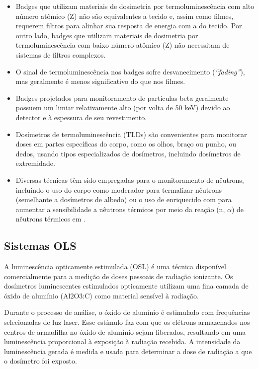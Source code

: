 \documentclass[11pt,a4paper]{article}
\newcounter{exemplo}
\begin{document}
	\begin{exemplo}
		\begin{itemize}
			\item Badges que utilizam materiais de dosimetria por termoluminescência com alto número atômico (Z) não são equivalentes a tecido e, assim como filmes, requerem filtros para alinhar sua resposta de energia com a do tecido. Por outro lado, badges que utilizam materiais de dosimetria por termoluminescência com baixo número atômico (Z) não necessitam de sistemas de filtros complexos.
			\item O sinal de termoluminescência nos badges sofre desvanecimento (\textit{``fading''}), mas geralmente é menos significativo do que nos filmes.
			\item Badges projetados para monitoramento de partículas beta geralmente possuem um limiar relativamente alto (por volta de 50 keV) devido ao detector e à espessura de seu revestimento.
			\item Dosímetros de termoluminescência (TLDs) são convenientes para monitorar doses em partes específicas do corpo, como os olhos, braço ou punho, ou dedos, usando tipos especializados de dosímetros, incluindo dosímetros de extremidade.
			\item Diversas técnicas têm sido empregadas para o monitoramento de nêutrons, incluindo o uso do corpo como moderador para termalizar nêutrons (semelhante a dosímetros de albedo) ou o uso de  enriquecido com  para aumentar a sensibilidade a nêutrons térmicos por meio da reação (n, $\alpha$) de nêutrons térmicos em .
		\end{itemize}
	\end{exemplo}

\subsection*{Sistemas OLS}


	A luminescência opticamente estimulada (OSL) é uma técnica disponível comercialmente para a medição de doses pessoais de radiação ionizante. Os dosímetros luminescentes estimulados opticamente utilizam uma fina camada de óxido de alumínio (Al2O3:C) como material sensível à radiação.

	Durante o processo de análise, o óxido de alumínio é estimulado com frequências selecionadas de luz laser. Esse estímulo faz com que os elétrons armazenados nos centros de armadilha no óxido de alumínio sejam liberados, resultando em uma luminescência proporcional à exposição à radiação recebida. A intensidade da luminescência gerada é medida e usada para determinar a dose de radiação a que o dosímetro foi exposto.
\end{document}
